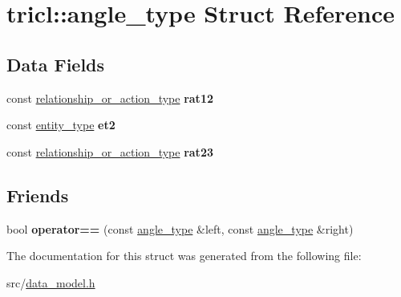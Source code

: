 \hypertarget{structtricl_1_1angle__type}{}\section{tricl\+:\+:angle\+\_\+type Struct Reference}
\label{structtricl_1_1angle__type}
\subsection*{Data Fields}
\begin{DoxyCompactItemize}
\item 
\mbox{\label{structtricl_1_1angle__type_a3a134c76bb8582d630926496752bc0fd}} 
const \hyperlink{data__model_8h_a2d01894944fb58a8fedc0912a48d13f8}{relationship\+\_\+or\+\_\+action\+\_\+type} {\bfseries rat12}
\item 
\mbox{\label{structtricl_1_1angle__type_a8d5d064234bac5aa4cd39fcec34b2fb4}} 
const \hyperlink{data__model_8h_afd4de3aedd5e48cf955f03457386e98f}{entity\+\_\+type} {\bfseries et2}
\item 
\mbox{\label{structtricl_1_1angle__type_a9a483aa66824f455a89d06a454e5b1b7}} 
const \hyperlink{data__model_8h_a2d01894944fb58a8fedc0912a48d13f8}{relationship\+\_\+or\+\_\+action\+\_\+type} {\bfseries rat23}
\end{DoxyCompactItemize}
\subsection*{Friends}
\begin{DoxyCompactItemize}
\item 
\mbox{\label{structtricl_1_1angle__type_a259cbf4e32421b1e65066025fa86e999}} 
bool {\bfseries operator==} (const \hyperlink{structtricl_1_1angle__type}{angle\+\_\+type} \&left, const \hyperlink{structtricl_1_1angle__type}{angle\+\_\+type} \&right)
\end{DoxyCompactItemize}


The documentation for this struct was generated from the following file\+:\begin{DoxyCompactItemize}
\item 
src/\hyperlink{data__model_8h}{data\+\_\+model.\+h}\end{DoxyCompactItemize}
